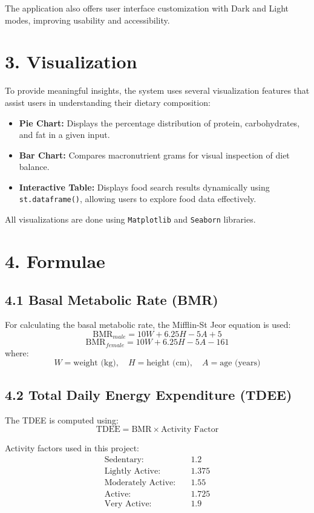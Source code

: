 \documentclass[12pt,a4paper]{article}
\begin{document}
The application also offers user interface customization with Dark and Light modes, improving usability and accessibility.

\section*{3. Visualization}
To provide meaningful insights, the system uses several visualization features that assist users in understanding their dietary composition:
\begin{itemize}
    \item \textbf{Pie Chart:} Displays the percentage distribution of protein, carbohydrates, and fat in a given input.
    \item \textbf{Bar Chart:} Compares macronutrient grams for visual inspection of diet balance.
    \item \textbf{Interactive Table:} Displays food search results dynamically using \texttt{st.dataframe()}, allowing users to explore food data effectively.
\end{itemize}

All visualizations are done using \texttt{Matplotlib} and \texttt{Seaborn} libraries.

\section*{4. Formulae}

\subsection*{4.1 Basal Metabolic Rate (BMR)}
For calculating the basal metabolic rate, the Mifflin-St Jeor equation is used:
\[
\text{BMR}_{male} = 10W + 6.25H - 5A + 5
\]
\[
\text{BMR}_{female} = 10W + 6.25H - 5A - 161
\]
where:
\[
W = \text{weight (kg)}, \quad H = \text{height (cm)}, \quad A = \text{age (years)}
\]

\subsection*{4.2 Total Daily Energy Expenditure (TDEE)}
The TDEE is computed using:
\[
\text{TDEE} = \text{BMR} \times \text{Activity Factor}
\]

Activity factors used in this project:
\begin{align*}
\text{Sedentary:} & \quad 1.2 \\
\text{Lightly Active:} & \quad 1.375 \\
\text{Moderately Active:} & \quad 1.55 \\
\text{Active:} & \quad 1.725 \\
\text{Very Active:} & \quad 1.9
\end{align*}
\end{document}
